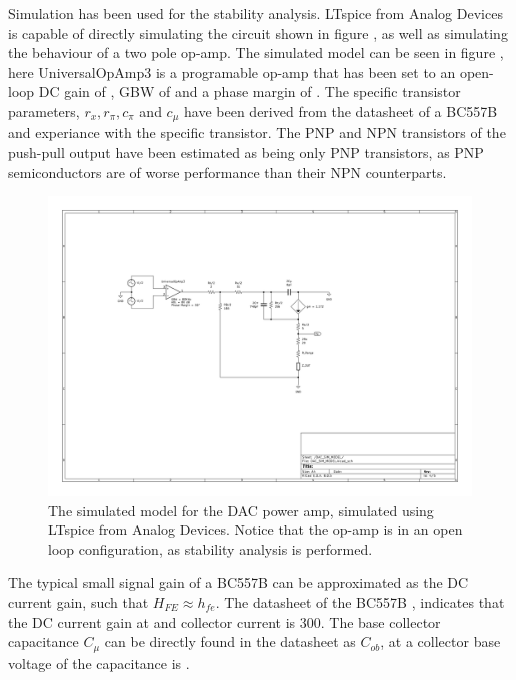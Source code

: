 Simulation has been used for the stability analysis. LTspice from Analog Devices is capable of directly simulating the circuit shown in figure , as well as simulating the behaviour of a two pole op-amp. The simulated model can be seen in figure , here UniversalOpAmp3 is a programable op-amp that has been set to an open-loop DC gain of , GBW of  and a phase margin of . The specific transistor parameters, $r_x, r_\pi, c_\pi$ and $c_\mu$ have been derived from the datasheet of a BC557B and experiance with the specific transistor. The PNP and NPN transistors of the push-pull output have been estimated as being only PNP transistors, as PNP semiconductors are of worse performance than their NPN counterparts. 

\begin{figure}[H]
    \centering
    \includegraphics[clip, trim=130 200 220 150, width=1\textwidth]{Sections/7_SystemDesign/Figures/7_1_1_5_DAC_FILTER-DAC_SIM_MODEL.pdf}
    \caption{The simulated model for the DAC power amp, simulated using LTspice from Analog Devices. Notice that the op-amp is in an open loop configuration, as stability analysis is performed.}
    \label{fig_7_1_1_5_DAC_POWER_AMP_SIM}
\end{figure}

The typical small signal gain of a BC557B can be approximated as the DC current gain, such that $H_{FE} \approx h_{fe}$. The datasheet of the BC557B \cite{BC557_datasheet}, indicates that the DC current gain at  and  collector current is 300. The base collector capacitance $C_\mu$ can be directly found in the datasheet as $C_{ob}$, at a collector base voltage of  the capacitance is . 

